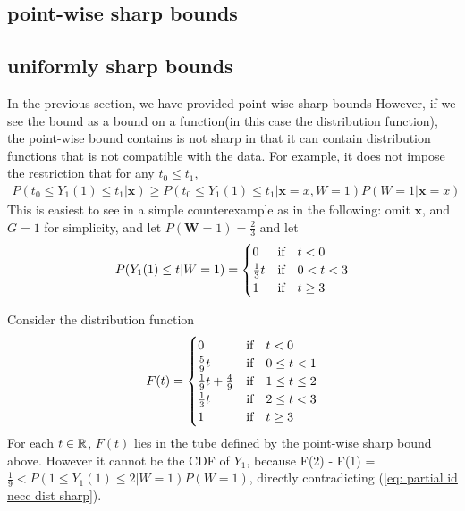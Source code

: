 \documentclass{article}
\begin{document}
\subsection{point-wise sharp bounds}

\subsection{uniformly sharp bounds}
In the previous section, we have provided point wise sharp bounds
However, if we see the bound as a bound on a function(in this case the distribution function), the point-wise bound contains is not sharp in that it can contain distribution functions that is not compatible with the data. 
For example, it does not impose the restriction that for any $ t_0 \le t_1$, 
\begin{align}
\label{eq: partial id necc dist sharp}
    P( t_0 \leq Y_1(1) \leq t_1 | \mathbf{x} ) \geq P ( t_0 \leq Y_1(1) \leq t_1 | \mathbf{x} = x, W = 1) P ( W =1 | \mathbf{x} = x)
\end{align}
This is easiest to see in a simple counterexample as in the following: 
omit $\mathbf{x}$, and $G=1$ for simplicity, and let $P ( \mathbf{W} = 1 ) = \frac{2}{3} $ and let 
\begin{align}
    P (Y_1(1) \leq t | W=1)=
    \begin{cases}
    0&\text{if}\quad t<0\\
    \frac{1}{3}t&\text{if}\quad 0< t< 3\\
    1 & \text{if}\quad t \geq 3
    \end{cases}
\end{align}


Consider the distribution function 
\begin{align}
    F(t) = \begin{cases}
        0&\text{if}\quad t < 0\\
        \frac{5}{9}t & \text{if}\quad 0 \leq t < 1 \\
        \frac{1}{9}t + \frac{4}{9} & \text{if}\quad  1 \leq t \leq 2\\
        \frac{1}{3}t & \text{if}\quad  2\leq t < 3\\
        1 & \text{if}\quad t \geq 3
    \end{cases}
\end{align}
For each $t \in\mathbb{R}$, $F(t)$ lies in the tube defined by the point-wise sharp bound above. However it cannot be the CDF of $ Y_1$, because F(2) - F(1) = $ \frac{1}{9}< P (1 \leq Y_1(1) \leq 2 | W=1) P( W=1)  $, directly contradicting (\ref{eq: partial id necc dist sharp}).
\end{document}

